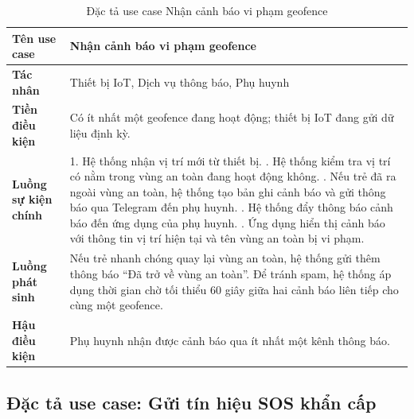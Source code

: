 \documentclass[../DoAn.tex]{subfiles}
\begin{document}
\begin{table}[H]
\centering
\caption{Đặc tả use case Nhận cảnh báo vi phạm geofence}
\label{table:uc_alert}
\begin{tabular}{|l|p{9.5cm}|}
\hline
\textbf{Tên use case}       & Nhận cảnh báo vi phạm geofence \\
\hline
\textbf{Tác nhân}           & Thiết bị IoT, Dịch vụ thông báo, Phụ huynh \\
\hline
\textbf{Tiền điều kiện}     & Có ít nhất một geofence đang hoạt động; thiết bị IoT đang gửi dữ liệu định kỳ. \\
\hline
\textbf{Luồng sự kiện chính} &
1. Hệ thống nhận vị trí mới từ thiết bị. \newline
2. Hệ thống kiểm tra vị trí có nằm trong vùng an toàn đang hoạt động không. \newline
3. Nếu trẻ đã ra ngoài vùng an toàn, hệ thống tạo bản ghi cảnh báo và gửi thông báo qua Telegram đến phụ huynh. \newline
4. Hệ thống đẩy thông báo cảnh báo đến ứng dụng của phụ huynh. \newline
5. Ứng dụng hiển thị cảnh báo với thông tin vị trí hiện tại và tên vùng an toàn bị vi phạm. \\
\hline
\textbf{Luồng phát sinh}    & Nếu trẻ nhanh chóng quay lại vùng an toàn, hệ thống gửi thêm thông báo ``Đã trở về vùng an toàn''. Để tránh spam, hệ thống áp dụng thời gian chờ tối thiểu 60 giây giữa hai cảnh báo liên tiếp cho cùng một geofence. \\
\hline
\textbf{Hậu điều kiện}      & Phụ huynh nhận được cảnh báo qua ít nhất một kênh thông báo. \\
\hline
\end{tabular}
\end{table}

\subsection{Đặc tả use case: Gửi tín hiệu SOS khẩn cấp}
\end{document}
